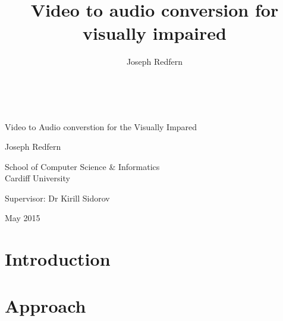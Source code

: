 \documentclass[11pt,a4paper]{memoir}
\author{Joseph Redfern}
\title{Video to audio conversion for visually impaired}
\date{}
\begin{document}
\thispagestyle{empty}

{%
\sffamily
\centering
\Large

~\vspace{\fill}

{\huge 
    Video to Audio converstion for the Visually Impared
}

\vspace{2.5cm}

{\LARGE
    Joseph Redfern
}

\vspace{3.5cm}

School of Computer Science \& Informatics\\
Cardiff University

\vspace{3.5cm}

Supervisor: Dr Kirill Sidorov 

\vspace{\fill}

May 2015

}

\cleardoublepage



\clearpage

\tableofcontents*

\clearpage

\chapter{Introduction}


\chapter{Approach}


\clearpage
\printbibliography
\end{document}
